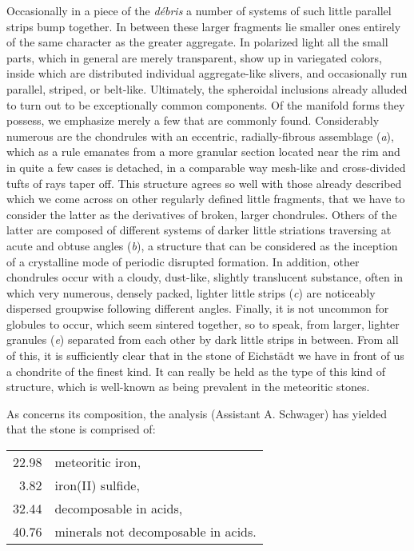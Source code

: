 \documentclass[a4paper, 12pt, oneside]{article}
\begin{document}
Occasionally in a piece of the \emph{débris} a number of systems of such little parallel strips bump together. In between these larger fragments lie smaller ones entirely of the same character as the greater aggregate. In polarized light all the small parts, which in general are merely transparent, show up in variegated colors, inside which are distributed individual aggregate-like slivers, and occasionally run parallel, striped, or belt-like. Ultimately, the spheroidal inclusions already alluded to turn out to be exceptionally common components. Of the manifold forms they possess, we emphasize merely a few that are commonly found. Considerably numerous are the chondrules with an eccentric, radially-fibrous assemblage (\emph{a}), which as a rule emanates from a more granular section located near the rim and in quite a few cases is detached, in a comparable way mesh-like and cross-divided tufts of rays taper off. This structure agrees so well with those already described which we come across on other regularly defined little fragments, that we have to consider the latter as the derivatives of broken, larger chondrules. Others of the latter are composed of different systems of darker little striations traversing at acute and obtuse angles (\emph{b}), a structure that can be considered as the inception of a crystalline mode of periodic disrupted formation. In addition, other chondrules occur with a cloudy, dust-like, slightly translucent substance, often in which very numerous, densely packed, lighter little strips (\emph{c}) are noticeably dispersed groupwise following different angles. Finally, it is not uncommon for globules to occur, which seem sintered together, so to speak, from larger, lighter granules (\emph{e}) separated from each other by dark little strips in between. From all of this, it is sufficiently clear that in the stone of Eichstädt we have in front of us a chondrite of the finest kind. It can really be held as the type of this kind of structure, which is well-known as being prevalent in the meteoritic stones.

As concerns its composition, the analysis (Assistant A. Schwager) has yielded that the stone is comprised of: 
\begin{center}
    \begin{tabular}{r l}
        22.98 & meteoritic iron,\\
        3.82 & iron(II) sulfide,\\
        32.44 & decomposable in acids,\\
        40.76 & minerals not decomposable in acids.\\
    \end{tabular}
\end{center}
\end{document}
